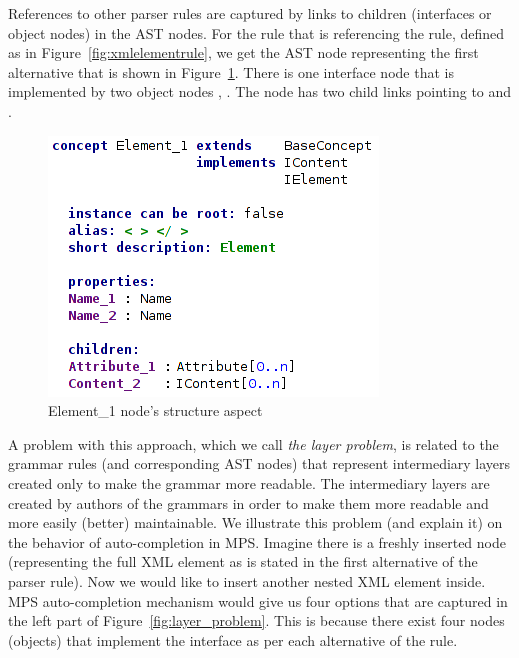 References to other parser rules are captured by links to children (interfaces or object nodes) in the AST nodes.
For the  rule that is referencing the  rule, defined as in Figure~\ref{fig:xmlelementrule}, we get the AST node representing the first alternative that is shown in Figure~\ref{fig:element_node_full}.
There is one  interface node that is implemented by two object nodes , .
The node  has two child links pointing to  and .

\begin{figure}[ht]
	\centering
	\includegraphics[scale=0.75]{./images/element_node_full.png}
	\caption{Element{\_}1 node's structure aspect}
	\label{fig:element_node_full}
\end{figure}

A problem with this approach, which we call \emph{the layer problem}, is related to the grammar rules (and corresponding AST nodes) that represent intermediary layers created only to make the grammar more readable.
The intermediary layers are created by authors of the grammars in order to make them more readable and more easily (better) maintainable.
We illustrate this problem (and explain it) on the behavior of auto-completion in MPS.
Imagine there is a freshly inserted  node (representing the full XML element as is stated in the first alternative of the  parser rule).
Now we would like to insert another nested XML element inside.
MPS auto-completion mechanism would give us four options that are captured in the left part of Figure~\ref{fig:layer_problem}.
This is because there exist four nodes (objects) that implement the  interface as per each alternative of the rule.

